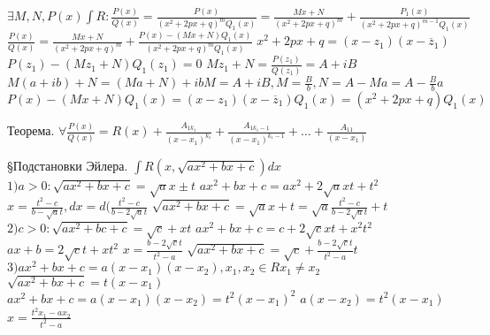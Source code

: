 \documentclass[12pt]{article}
\begin{document}
    $\exists M, N, P(x) \int R: \frac{P(x)}{Q(x)} = \frac{P(x)}{(x^2 + 2px + q)^m Q_1(x)} = \frac{Mx + N}{(x^2 + 2px + q)^m} + \frac{P_1(x)}{(x^2 + 2px + q)^{m-1} Q_1(x)}$ \newline
    $\frac{P(x)}{Q(x)} = \frac{Mx + N}{(x^2 + 2px + q)^m} + \frac{P(x) - (Mx + N)Q_1(x)}{(x^2 + 2px + q)^m Q_1(x)}$ \newline
    $x^2 + 2px + q = (x - z_1)(x - \overline z_1)$ \newline
    $P(z_1) - (Mz_1 + N)Q_1(z_1) = 0$ \newline
    $Mz_1 + N = \frac{P(z_1)}{Q(z_1)} = A + iB$ \newline
    $M(a+ib) + N = (Ma+N) + ibM = A + iB, M = \frac{B}b, N = A - Ma = A - \frac{B}b a$
    $P(x) - (Mx + N)Q_1(x) = (x-z_1)(x-\overline z_1)Q_1(x) = (x^2 + 2px + q) Q_1(x)$ \newline

    Теорема. $\forall \frac{P(x)}{Q(x)} = R(x) + \frac{A_{1 k_1}}{(x-x_1)^{k_1}} + \frac{A_{1 k_1 - 1}}{(x-x_1)^{k_1 - 1}} + \dots + \frac{A_{1 1}}{(x-x_1)}$ \newline

    \S Подстановки Эйлера. \newline
    $\int R(x, \sqrt{ax^2 + bx + c})dx$ \newline
    $1) a > 0: \sqrt{ax^2 + bx + c} = \sqrt{a}x \pm t$ \newline
    $ ax^2 + bx + c = ax^2 + 2\sqrt{a}xt + t^2$ \newline
    $ x = \frac{t^2 - c}{b - \sqrt{a}t}, dx = d(\frac{t^2 - c}{b - 2\sqrt{a}t}$ \newline
    $\sqrt{ax^2 + bx + c} = \sqrt{a}x + t = \sqrt{a}\frac{t^2 - c}{b - 2\sqrt{a}t} + t$ \newline
    $2) c > 0: \sqrt{ax^2 + bc + c} = \sqrt{c} + xt$ \newline
    $ax^2 + bx + c = c + 2\sqrt{c}xt + x^2t^2$ \newline
    $ax + b = 2\sqrt{c}t + xt^2$ \newline
    $x = \frac{b - 2\sqrt{c}t}{t^2 - a}$ \newline
    $\sqrt{ax^2 + bx + c} = \sqrt{c} + \frac{b - 2\sqrt{c}t}{t^2 - a}t$ \newline
    $3) ax^2 + bx + c = a(x-x_1)(x-x_2), x_1, x_2 \in R x_1 \not = x_2$ \newline
    $\sqrt{ax^2 + bx + c} = t(x - x_1)$ \newline
    $ax^2 + bx + c = a(x - x_1)(x - x_2)= t^2 (x - x_1)^2$ \newline
    $a(x - x_2) = t^2(x - x_1)$ \newline
    $x = \frac{t^2x_1 - ax_2}{t^2 - a}$ \newline
\end{document}
